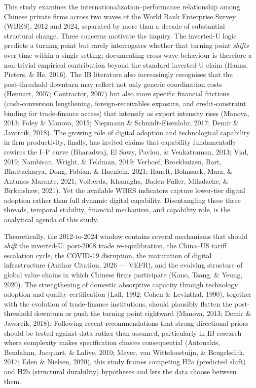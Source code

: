 \documentclass[12pt,a4paper]{article}
\begin{document}
This study examines the internationalization--performance relationship
among Chinese private firms across two waves of the World Bank
Enterprise Survey (WBES), 2012 and 2024, separated by more than a decade
of substantial structural change. Three concerns motivate the inquiry.
The inverted‑U logic predicts a turning point but rarely interrogates
whether that turning point \emph{shifts} over time within a single
setting; documenting cross‑wave behaviour is therefore a non‑trivial
empirical contribution beyond the standard inverted‑U claim (Haans,
Pieters, \& He, 2016). The IB literature also increasingly recognises
that the post‑threshold downturn may reflect not only generic
coordination costs (Hennart, 2007; Contractor, 2007) but also more
specific financial frictions (cash‑conversion lengthening,
foreign‑receivables exposure, and credit‑constraint binding for
trade‑finance access) that intensify as export intensity rises (Manova,
2013; Foley \& Manova, 2015; Niepmann \& Schmidt-Eisenlohr, 2017; Demir
\& Javorcik, 2018). The growing role of digital adoption and
technological capability in firm productivity, finally, has invited
claims that capability fundamentally rewires the I--P curve (Bharadwaj,
El Sawy, Pavlou, \& Venkatraman, 2013; Vial, 2019; Nambisan, Wright, \&
Feldman, 2019; Verhoef, Broekhuizen, Bart, Bhattacharya, Dong, Fabian,
\& Haenlein, 2021; Hanelt, Bohnsack, Marz, \& Antunes Marante, 2021;
Volberda, Khanagha, Baden-Fuller, Mihalache, \& Birkinshaw, 2021). Yet
the available WBES indicators capture lower‑tier digital adoption rather
than full dynamic digital capability. Disentangling these three threads,
temporal stability, financial mechanism, and capability role, is the
analytical agenda of this study.

Theoretically, the 2012-to-2024 window contains several mechanisms that
should \emph{shift} the inverted-U: post-2008 trade re-equilibration,
the China--US tariff escalation cycle, the COVID-19 disruption, the
maturation of digital infrastructure (Author Citation, 2026 --- VEFR),
and the evolving structure of global value chains in which Chinese firms
participate (Kano, Tsang, \& Yeung, 2020). The strengthening of domestic
absorptive capacity through technology adoption and quality
certification (Lall, 1992; Cohen \& Levinthal, 1990), together with the
evolution of trade-finance institutions, should plausibly flatten the
post-threshold downturn or push the turning point rightward (Manova,
2013; Demir \& Javorcik, 2018). Following recent recommendations that
strong directional priors should be tested against data rather than
assumed, particularly in IB research where complexity makes
specification choices consequential (Antonakis, Bendahan, Jacquart, \&
Lalive, 2010; Meyer, van Witteloostuijn, \& Beugelsdijk, 2017; Eden \&
Nielsen, 2020), this study frames competing H2a (predicted shift) and
H2b (structural durability) hypotheses and lets the data choose between
them.
\end{document}
